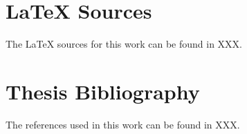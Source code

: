 
\begin{appendices}

  \section{LaTeX Sources}
  \label{appendix:latex_sources}
  The {\LaTeX} sources for this work can be found in XXX.

  \section{Thesis Bibliography}
  \label{appendix:thesis_bibliography}
  The references used in this work can be found in XXX.

\end{appendices}
